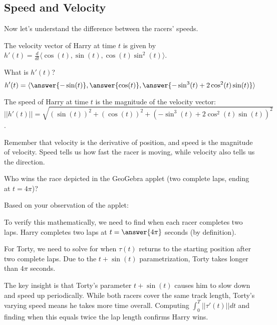 \documentclass{ximera}
\begin{document}
\subsection*{Speed and Velocity}

Now let's understand the difference between the racers' speeds.

\begin{problem}
    The velocity vector of Harry at time $t$ is given by $h'(t)=\frac{d}{dt}\langle \cos(t), \sin(t), \cos(t)\sin^2(t)\rangle$.
    
    What is $h'(t)$?
    \[h'(t)=\langle \answer{-\sin(t)}, \answer{\cos(t)}, \answer{-\sin^3(t)+2\cos^2(t)\sin(t)}\rangle\]
    
    The speed of Harry at time $t$ is the magnitude of the velocity vector: $||h'(t)||=\sqrt{(\sin(t))^2+(\cos(t))^2+(-\sin^3(t)+2\cos^2(t)\sin(t))^2}$.
    
    \begin{feedback}
        Remember that velocity is the derivative of position, and speed is the magnitude of velocity. Speed tells us how fast the racer is moving, while velocity also tells us the direction.
    \end{feedback}
\end{problem}

\begin{problem}
    Who wins the race depicted in the GeoGebra applet (two complete laps, ending at $t=4\pi$)?
    
    Based on your observation of the applet:
    \begin{multipleChoice}
    \end{multipleChoice}
    
    To verify this mathematically, we need to find when each racer completes two laps. Harry completes two laps at $t=\answer{4\pi}$ seconds (by definition).
    
    For Torty, we need to solve for when $\tau(t)$ returns to the starting position after two complete laps. Due to the $t+\sin(t)$ parametrization, Torty takes longer than $4\pi$ seconds.
    
    \begin{feedback}
        The key insight is that Torty's parameter $t+\sin(t)$ causes him to slow down and speed up periodically. While both racers cover the same track length, Torty's varying speed means he takes more time overall. Computing $\int_0^T ||\tau'(t)||dt$ and finding when this equals twice the lap length confirms Harry wins.
    \end{feedback}
\end{problem}
\end{document}

